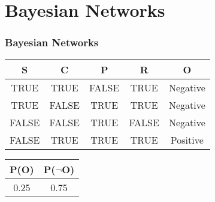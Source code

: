 \documentclass[aspectratio=169, 10pt]{beamer}
\begin{document}
\section{Bayesian Networks}
\begin{frame}[t]
    \frametitle{Bayesian Networks}

    \begin{table}[]
        \small
        \begin{tabular}{cccc|c}
        \textbf{S} & \textbf{C} & \textbf{P} & \textbf{R} & \textbf{O} \\ \hline
        TRUE       & TRUE       & FALSE      & TRUE       & Negative   \\
        TRUE       & FALSE      & TRUE       & TRUE       & Negative   \\
        FALSE      & FALSE      & TRUE       & FALSE      & Negative   \\
        FALSE      & TRUE       & TRUE       & TRUE       & Positive  
        \end{tabular}
    \end{table}

    \begin{figure}
        \center
    \end{figure}

    \begin{table}[]
        \small
        \begin{tabular}{cc}
        P(O) & P($\neg$O) \\ \hline
        0.25 & 0.75 \\
        \end{tabular}
    \end{table}


\end{frame}
\end{document}
